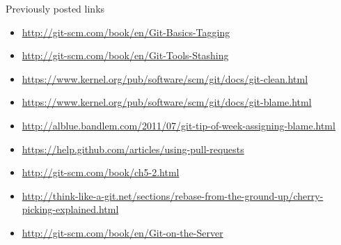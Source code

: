 \documentclass[10pt,a4paper]{beamer}
\begin{document}
\begin{frame}{Previously posted links}
\begin{itemize}
\item \href{http://git-scm.com/book/en/Git-Basics-Tagging}{\color{blue}http://git-scm.com/book/en/Git-Basics-Tagging}
\item \href{http://git-scm.com/book/en/Git-Tools-Stashing}{\color{blue}http://git-scm.com/book/en/Git-Tools-Stashing}
\item \href{https://www.kernel.org/pub/software/scm/git/docs/git-clean.html}{\color{blue}https://www.kernel.org/pub/software/scm/git/docs/git-clean.html}
\item \href{https://www.kernel.org/pub/software/scm/git/docs/git-blame.html}{\color{blue}https://www.kernel.org/pub/software/scm/git/docs/git-blame.html}
\item \href{http://alblue.bandlem.com/2011/07/git-tip-of-week-assigning-blame.html}{\color{blue}http://alblue.bandlem.com/2011/07/git-tip-of-week-assigning-blame.html}
\item \href{https://help.github.com/articles/using-pull-requests}{\color{blue}https://help.github.com/articles/using-pull-requests}
\item \href{http://git-scm.com/book/ch5-2.html}{\color{blue}http://git-scm.com/book/ch5-2.html}
\item \href{http://think-like-a-git.net/sections/rebase-from-the-ground-up/cherry-picking-explained.html}{\color{blue}http://think-like-a-git.net/sections/rebase-from-the-ground-up/cherry-picking-explained.html}
\item \href{http://git-scm.com/book/en/Git-on-the-Server}{\color{blue}http://git-scm.com/book/en/Git-on-the-Server}
\end{itemize}
\end{frame}
\end{document}
